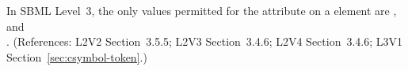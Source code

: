 In SBML Level~3, the only values permitted for the
 attribute on a  element are
,
 and \\
.
(References: L2V2 Section~3.5.5; L2V3 Section~3.4.6; 
L2V4 Section~3.4.6; L3V1 Section~\ref{sec:csymbol-token}.)
